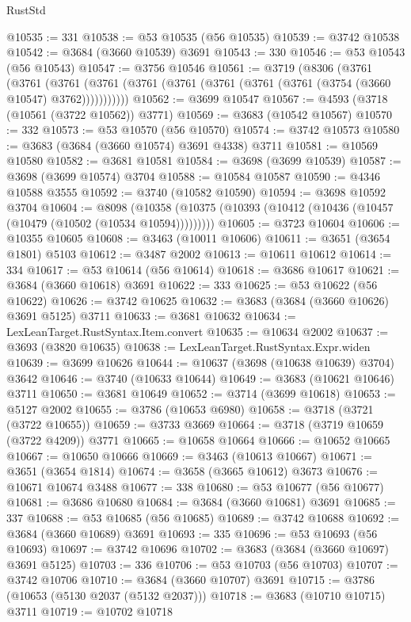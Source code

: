 \begin{lexlean}{RustStd}
\begin{coremodule}
@10535 := 331
@10538 := @53 @10535 (@56 @10535)
@10539 := @3742 @10538
@10542 := @3684 (@3660 @10539) @3691
@10543 := 330
@10546 := @53 @10543 (@56 @10543)
@10547 := @3756 @10546
@10561 := @3719
    (@8306
      (@3761
        (@3761
          (@3761 (@3761 (@3761 (@3761 (@3761 (@3761 (@3761 (@3754 (@3660 @10547) @3762)))))))))))
@10562 := @3699 @10547
@10567 := @4593 (@3718 (@10561 (@3722 @10562)) @3771)
@10569 := @3683 (@10542 @10567)
@10570 := 332
@10573 := @53 @10570 (@56 @10570)
@10574 := @3742 @10573
@10580 := @3683 (@3684 (@3660 @10574) @3691 @4338) @3711
@10581 := @10569 @10580
@10582 := @3681 @10581
@10584 := @3698 (@3699 @10539)
@10587 := @3698 (@3699 @10574) @3704
@10588 := @10584 @10587
@10590 := @4346 @10588 @3555
@10592 := @3740 (@10582 @10590)
@10594 := @3698 @10592 @3704
@10604 := @8098
    (@10358 (@10375 (@10393 (@10412 (@10436 (@10457 (@10479 (@10502 (@10534 @10594)))))))))
@10605 := @3723 @10604
@10606 := @10355 @10605
@10608 := @3463 (@10011 @10606)
@10611 := @3651 (@3654 @1801) @5103
@10612 := @3487 @2002
@10613 := @10611 @10612
@10614 := 334
@10617 := @53 @10614 (@56 @10614)
@10618 := @3686 @10617
@10621 := @3684 (@3660 @10618) @3691
@10622 := 333
@10625 := @53 @10622 (@56 @10622)
@10626 := @3742 @10625
@10632 := @3683 (@3684 (@3660 @10626) @3691 @5125) @3711
@10633 := @3681 @10632
@10634 := LexLeanTarget.RustSyntax.Item.convert
@10635 := @10634 @2002
@10637 := @3693 (@3820 @10635)
@10638 := LexLeanTarget.RustSyntax.Expr.widen
@10639 := @3699 @10626
@10644 := @10637 (@3698 (@10638 @10639) @3704) @3642
@10646 := @3740 (@10633 @10644)
@10649 := @3683 (@10621 @10646) @3711
@10650 := @3681 @10649
@10652 := @3714 (@3699 @10618)
@10653 := @5127 @2002
@10655 := @3786 (@10653 @6980)
@10658 := @3718 (@3721 (@3722 @10655))
@10659 := @3733 @3669
@10664 := @3718 (@3719 @10659 (@3722 @4209)) @3771
@10665 := @10658 @10664
@10666 := @10652 @10665
@10667 := @10650 @10666
@10669 := @3463 (@10613 @10667)
@10671 := @3651 (@3654 @1814)
@10674 := @3658 (@3665 @10612) @3673
@10676 := @10671 @10674 @3488
@10677 := 338
@10680 := @53 @10677 (@56 @10677)
@10681 := @3686 @10680
@10684 := @3684 (@3660 @10681) @3691
@10685 := 337
@10688 := @53 @10685 (@56 @10685)
@10689 := @3742 @10688
@10692 := @3684 (@3660 @10689) @3691
@10693 := 335
@10696 := @53 @10693 (@56 @10693)
@10697 := @3742 @10696
@10702 := @3683 (@3684 (@3660 @10697) @3691 @5125)
@10703 := 336
@10706 := @53 @10703 (@56 @10703)
@10707 := @3742 @10706
@10710 := @3684 (@3660 @10707) @3691
@10715 := @3786 (@10653 (@5130 @2037 (@5132 @2037)))
@10718 := @3683 (@10710 @10715) @3711
@10719 := @10702 @10718

\end{coremodule}
\end{lexlean}
